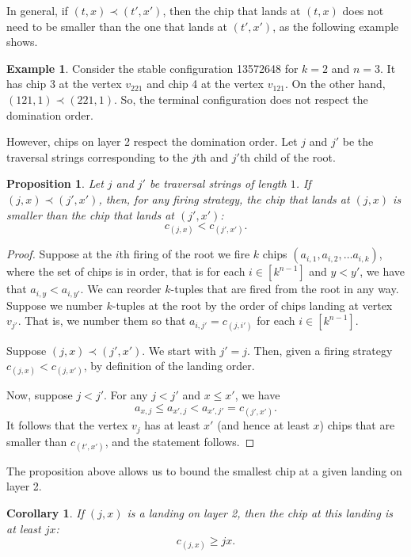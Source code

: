 \documentclass[11pt]{article}
\newtheorem{corollary}{Corollary}[theorem] %
\newtheorem{proposition}[theorem]{Proposition}
\theoremstyle{definition}
\newtheorem{example}{Example}
\theoremstyle{remark}
\begin{document}
In general, if $(t,x) \prec (t',x')$, then the chip that lands at $(t, x)$ does not need to be smaller than the one that lands at $(t', x')$, as the following example shows.

\begin{example}
    Consider the stable configuration 13572648 for $k=2$ and $n=3$. It has chip 3 at the vertex $v_{221}$ and chip 4 at the vertex $v_{121}$. On the other hand, $(121, 1) \prec (221, 1)$. So, the terminal configuration does not respect the domination order.
\end{example}

However, chips on layer 2 respect the domination order.  Let $j$ and $j'$ be the traversal strings corresponding to the $j$th and $j'$th child of the root. 

\begin{proposition}
\label{prop:smallerchip}
    Let $j$ and $j'$ be traversal strings of length $1$. If $(j,x) \prec (j',x')$, then, for any firing strategy, the chip that lands at $(j, x)$ is smaller than the chip that lands at $(j',x')$:
    \[c_{(j,x)} < c_{(j',x')}.\]
\end{proposition}

\begin{proof}
Suppose at the $i$th firing of the root we fire $k$ chips $(a_{i, 1}, a_{i, 2}, \dots a_{i, k})$, where the set of chips is in order, that is for each $i \in [k^{n-1}]$ and $y < y'$, we have that $a_{i, y} < a_{i, y'}$. We can reorder $k$-tuples that are fired from the root in any way. Suppose we number $k$-tuples at the root by the order of chips landing at vertex $v_{j'}$. That is, we number them so that $a_{i, j'} = c_{(j, i')}$ for each $i \in [k^{n-1}]$.

Suppose $(j,x) \prec (j',x')$. We start with $j' = j$. Then, given a firing strategy $c_{(j,x)} < c_{(j,x')}$, by definition of the landing order.

Now, suppose $j < j'$. For any $j < j'$ and $x \leq x'$, we have
\[a_{x, j} \leq a_{x', j} < a_{x', j'}= c_{(j', x')}.\]
It follows that the vertex $v_{j}$ has at least $x'$ (and hence at least $x$) chips that are smaller than $c_{(t',x')}$, and the statement follows.
\end{proof}

The proposition above allows us to bound the smallest chip at a given landing on layer 2.

\begin{corollary}
\label{cor:smallestbound}
    If $(j,x)$ is a landing on layer 2, then the chip at this landing is at least $jx$:
    \[c_{(j,x)} \geq jx.\]
\end{corollary}
\end{document}
